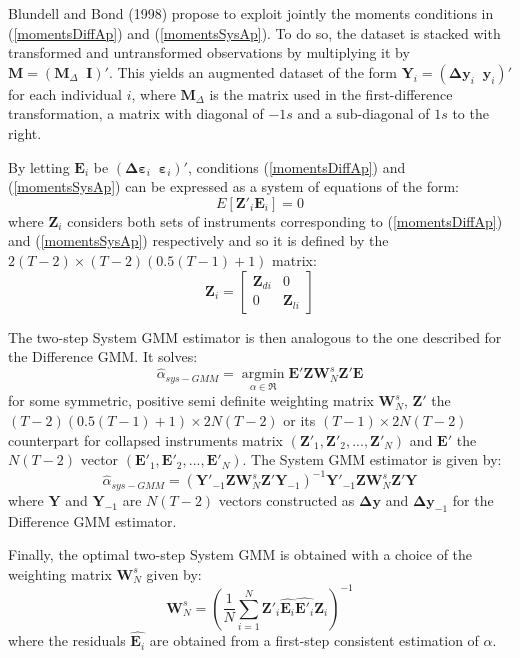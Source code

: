 \documentclass[a4paper, 12pt]{article}
\begin{document}
Blundell and Bond (1998) propose to exploit jointly the moments conditions in (\ref{momentsDiffAp}) and (\ref{momentsSysAp}). To do so, the dataset is stacked with transformed and untransformed observations by multiplying it by $\mathbf{M}=\left(\mathbf{M}_{\Delta}\;\;\mathbf{I}\right)'$. This yields an augmented dataset of the form $ \mathbf{Y}_{i}=\left(\mathbf{\Delta} \mathbf{y}_{i}\;\;\mathbf{y}_i\right)'$ for each individual $i$, where $\mathbf{M}_{\Delta}$ is the matrix used in the first-difference transformation, a matrix with diagonal of $-1s$ and a sub-diagonal of $1s$ to the right. 

By letting $\mathbf{E}_i$ be $\left(\mathbf{\Delta} \mathbf{\varepsilon}_{i}\;\;\mathbf{\varepsilon}_i\right)'$, conditions (\ref{momentsDiffAp}) and (\ref{momentsSysAp}) can be expressed as a system of equations of the form:
\begin{equation*}
E\left[ \mathbf{Z}'_{i}\mathbf{E}_{i}\right]=0
\end{equation*}
where $\mathbf{Z}_{i}$ considers both sets of instruments corresponding to (\ref{momentsDiffAp}) and (\ref{momentsSysAp}) respectively and so it is defined by the $2(T-2)\times (T-2)(0.5(T-1)+1)$ matrix:
\[{\mathbf{Z}_i} = \left[ {\begin{array}{*{20}{c}}
{{\mathbf{Z}_{di}}}&0\\
0&{{\mathbf{Z}_{li}}}
\end{array}} \right]\]

The two-step System GMM estimator is then analogous to the one described for the Difference GMM. It solves:
\[
{{\hat \alpha }_{sys - GMM}} = \mathop {\arg \min }\limits_{\alpha  \in \Re } \mathbf{E}' \mathbf{Z}{\mathbf{W}_{N}^s}\mathbf{Z}'\mathbf{E} 
\]
for some symmetric, positive semi definite weighting matrix $\mathbf{W}_{N}^s$, $\mathbf{Z}'$ the $(T-2)(0.5(T-1)+1)\times 2N(T-2)$ or its $(T-1)\times 2N(T-2)$ counterpart for collapsed instruments matrix $(\mathbf{Z}'_{1},\mathbf{Z}'_{2},...,\mathbf{Z}'_{N})$ and $\mathbf{E}'$ the $N(T-2)$ vector $(\mathbf{E}'_1,\mathbf{E}'_2,...,\mathbf{E}'_N)$. The System GMM estimator is given by:
\[
{{\hat \alpha }_{sys - GMM}} = {\left( \mathbf{Y}'_{-1}\mathbf{Z} \mathbf{W}_{N}^s \mathbf{Z}' \mathbf{Y}_{-1} \right)^{ - 1}} \mathbf{Y}'_{-1}\mathbf{Z} \mathbf{W}_{N}^s \mathbf{Z}' \mathbf{Y} 
\]
where $\mathbf{Y}$ and $\mathbf{Y}_{-1}$ are $N(T-2)$ vectors constructed as $\mathbf{\Delta y}$ and $\mathbf{\Delta y}_{-1}$ for the Difference GMM estimator.

Finally, the optimal two-step System GMM is obtained with a choice of the weighting matrix $\mathbf{W}_{N}^s$ given by:
\[
\mathbf{W}_{N}^s=\left( \frac{1}{N} \sum\limits_{i=1}^{N} \mathbf{Z}'_{i} \hat{ \mathbf{E}_i} \hat{ \mathbf{E}'_i} \mathbf{Z}_{i} \right)^{-1}
\]
where the residuals $\hat{ \mathbf{E}_i}$ are obtained from a first-step consistent estimation of $\alpha$.
\end{document}

